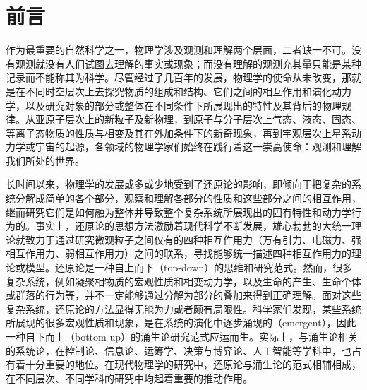 \chapter*{前言}

作为最重要的自然科学之一，物理学涉及观测和理解两个层面，二者缺一不可。没有观测就没有人们试图去理解的事实或现象；而没有理解的观测充其量只能是某种记录而不能称其为科学。尽管经过了几百年的发展，物理学的使命从未改变，那就是在不同时空层次上去探究物质的组成和结构、它们之间的相互作用和演化动力学，以及研究对象的部分或整体在不同条件下所展现出的特性及其背后的物理规律。从亚原子层次上的新粒子及新物理，到原子与分子层次上气态、液态、固态、等离子态物质的性质与相变及其在外加条件下的新奇现象，再到宇观层次上星系动力学或宇宙的起源，各领域的物理学家们始终在践行着这一崇高使命：观测和理解我们所处的世界。

长时间以来，物理学的发展或多或少地受到了还原论的影响，即倾向于把复杂的系统分解成简单的各个部分，观察和理解各部分的性质和这些部分之间的相互作用，继而研究它们是如何融为整体并导致整个复杂系统所展现出的固有特性和动力学行为的。事实上，还原论的思想方法激励着现代科学不断发展，雄心勃勃的大统一理论就致力于通过研究微观粒子之间仅有的四种相互作用力（万有引力、电磁力、强相互作用力、弱相互作用力）之间的联系，寻找能够统一描述四种相互作用力的理论或模型。还原论是一种自上而下（top-down）的思维和研究范式。然而，很多复杂系统，例如凝聚相物质的宏观性质和相变动力学，以及生命的产生、生命个体或群落的行为等，并不一定能够通过分解为部分的叠加来得到正确理解。面对这些复杂系统，还原论的方法显得无能为力或者颇有局限性。科学家们发现，某些系统所展现的很多宏观性质和现象，是在系统的演化中逐步涌现的（emergent），因此一种自下而上（bottom-up）的涌生论研究范式应运而生。实际上，与涌生论相关的系统论，在控制论、信息论、运筹学、决策与博弈论、人工智能等学科中，也占有着十分重要的地位。在现代物理学的研究中，还原论与涌生论的范式相辅相成，在不同层次、不同学科的研究中均起着重要的推动作用。

